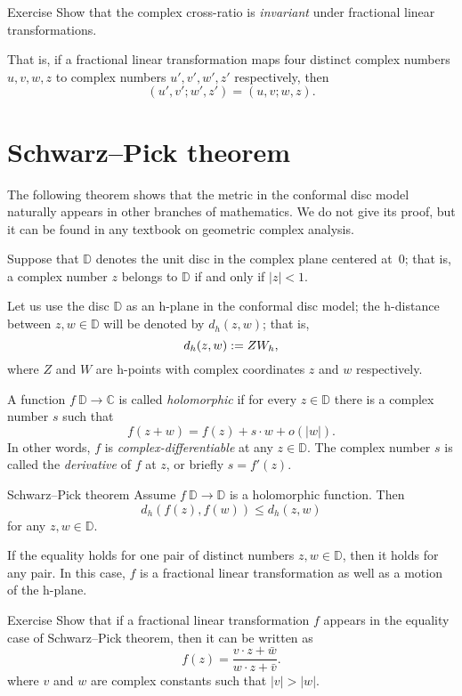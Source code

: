 \begin{thm}{Exercise}\label{ex:C-cross-ratio}
Show that the complex cross-ratio is {}\emph{invariant} under fractional linear transformations. 

That is, if a fractional linear transformation maps four distinct complex numbers $u, v, w, z$ to complex numbers $u', v', w', z'$ respectively, then
$$
(u',v';w',z')
=
(u,v;w,z).
$$

\end{thm}

\section{Schwarz--Pick theorem}

The following theorem shows 
that the metric in the conformal disc model naturally appears in other branches of mathematics.
We do not give its proof, but it can be found in any textbook on geometric complex analysis.

Suppose that $\mathbb{D}$ denotes the unit disc in the complex plane centered at~$0$;
that is, a complex number $z$
belongs to $\mathbb{D}$ if and only if $|z|<1$.

Let us use the disc $\mathbb{D}$ as an h-plane in the conformal disc model;
the h-distance between $z, w\in\mathbb{D}$ will be denoted by $d_h(z,w)$;
that is,
\[d_h(z,w):= ZW_h,\]
where $Z$ and $W$ are h-points with complex coordinates $z$ and $w$ respectively.

A function $f\:\mathbb{D}\to \mathbb{C}$ is called \emph{holomorphic} if for every $z\in \mathbb{D}$
there is a complex number $s$ such that
\[f(z+w)=f(z)+s\cdot w+o(|w|).\]
In other words, $f$ is {}\emph{complex-differentiable}
at any $z\in\mathbb{D}$.
The complex number $s$ is called the {}\emph{derivative} of $f$ at $z$, or briefly $s=f'(z)$.

\begin{thm}{Schwarz--Pick theorem}
Assume $f\: \mathbb{D}\to \mathbb{D}$ is a holomorphic function.
Then 
\[d_h(f(z),f(w))\le d_h(z,w)\]
for any $z,w\in \mathbb{D}$.

If the equality holds for one pair of distinct numbers $z,w\in \mathbb{D}$, then it holds for any pair. 
In this case, $f$ is a fractional linear transformation as well as a motion of the h-plane.
\end{thm}

\begin{thm}{Exercise}\label{ex:schwarz-moebius}
Show that if a fractional linear transformation $f$ appears in the equality case of Schwarz--Pick theorem, then it can be written as 
\[f(z)=\frac{v\cdot z+\bar w}{w\cdot z+\bar v}.\]
where $v$ and $w$ are complex constants such that $|v|>|w|$.
\end{thm}

